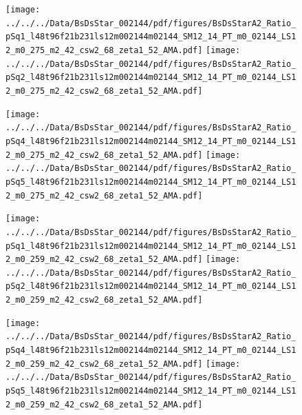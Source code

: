 \documentclass[a4paper,10pt]{article}
\begin{document}
\begin{figure}[p]
 \texttt{[image: ../../../Data/BsDsStar\_002144/pdf/figures/BsDsStarA2\_Ratio\_pSq1\_l48t96f21b231ls12m002144m02144\_SM12\_14\_PT\_m0\_02144\_LS12\_m0\_275\_m2\_42\_csw2\_68\_zeta1\_52\_AMA.pdf]} 
 \texttt{[image: ../../../Data/BsDsStar\_002144/pdf/figures/BsDsStarA2\_Ratio\_pSq2\_l48t96f21b231ls12m002144m02144\_SM12\_14\_PT\_m0\_02144\_LS12\_m0\_275\_m2\_42\_csw2\_68\_zeta1\_52\_AMA.pdf]} 
 \end{figure}
\begin{figure}[p]
 \texttt{[image: ../../../Data/BsDsStar\_002144/pdf/figures/BsDsStarA2\_Ratio\_pSq4\_l48t96f21b231ls12m002144m02144\_SM12\_14\_PT\_m0\_02144\_LS12\_m0\_275\_m2\_42\_csw2\_68\_zeta1\_52\_AMA.pdf]} 
 \texttt{[image: ../../../Data/BsDsStar\_002144/pdf/figures/BsDsStarA2\_Ratio\_pSq5\_l48t96f21b231ls12m002144m02144\_SM12\_14\_PT\_m0\_02144\_LS12\_m0\_275\_m2\_42\_csw2\_68\_zeta1\_52\_AMA.pdf]} 
 \end{figure}
\begin{figure}[p]
 \texttt{[image: ../../../Data/BsDsStar\_002144/pdf/figures/BsDsStarA2\_Ratio\_pSq1\_l48t96f21b231ls12m002144m02144\_SM12\_14\_PT\_m0\_02144\_LS12\_m0\_259\_m2\_42\_csw2\_68\_zeta1\_52\_AMA.pdf]} 
 \texttt{[image: ../../../Data/BsDsStar\_002144/pdf/figures/BsDsStarA2\_Ratio\_pSq2\_l48t96f21b231ls12m002144m02144\_SM12\_14\_PT\_m0\_02144\_LS12\_m0\_259\_m2\_42\_csw2\_68\_zeta1\_52\_AMA.pdf]} 
 \end{figure}
\clearpage
\begin{figure}[p]
 \texttt{[image: ../../../Data/BsDsStar\_002144/pdf/figures/BsDsStarA2\_Ratio\_pSq4\_l48t96f21b231ls12m002144m02144\_SM12\_14\_PT\_m0\_02144\_LS12\_m0\_259\_m2\_42\_csw2\_68\_zeta1\_52\_AMA.pdf]} 
 \texttt{[image: ../../../Data/BsDsStar\_002144/pdf/figures/BsDsStarA2\_Ratio\_pSq5\_l48t96f21b231ls12m002144m02144\_SM12\_14\_PT\_m0\_02144\_LS12\_m0\_259\_m2\_42\_csw2\_68\_zeta1\_52\_AMA.pdf]} 
 \end{figure}
\clearpage
\end{document}
